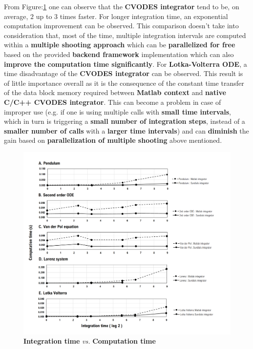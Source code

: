 \documentclass[12pt, letterpaper]{article}
\begin{document}
From Figure:\ref{label_chart} one can observe that the \textbf{CVODES integrator} tend to be, on average, $2$ up to $3$ times faster. For longer integration time, an exponential computation improvement can be observed. This comparison doesn't take into consideration that, most of the time, multiple integration intervals are computed within a \textbf{multiple shooting approach} which can be \textbf{parallelized for free} based on the provided \textbf{backend framework} implementation which can also \textbf{improve the computation time significantly}. For \textbf{Lotka-Volterra ODE}, a time disadvantage of the \textbf{CVODES integrator} can be observed. This result is of little importance overall as it is the consequence of the constant time transfer of the data block memory required between \textbf{Matlab context} and \textbf{native C/C++ CVODES integrator}. This can become a problem in case of improper use (e.g. if one is using multiple calls with \textbf{small time intervals}, which in turn is triggering a \textbf{small number of integration steps}, instead of a \textbf{smaller number of calls} with a \textbf{larger time intervals}) and can \textbf{diminish} the gain based on \textbf{parallelization of multiple shooting} above mentioned.

\begin{figure}[h!]
    \centering
    \includegraphics[scale=0.8]{images/chart.png}
    \caption{ \textbf{Integration time} \textit{vs.} \textbf{Computation time}}
    \label{label_chart}
\end{figure}
\end{document}
